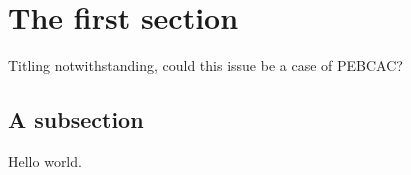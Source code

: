 \documentclass[../../main.tex]{subfiles}
\begin{document}
\section{The first section}
Titling notwithstanding, could this issue be a case of PEBCAC?

\subsection{A subsection}
Hello world.
\end{document}
